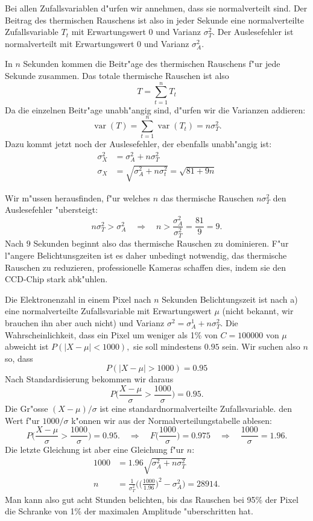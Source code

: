 \begin{loesung}
Bei allen Zufallsvariablen d"urfen wir annehmen, dass sie normalverteilt
sind. Der Beitrag des thermischen Rauschens ist also in jeder Sekunde
eine normalverteilte Zufallsvariable $T_t$ mit Erwartungswert 0
und Varianz $\sigma_T^2$.
Der Auslesefehler ist normalverteilt mit Erwartungswert 0 und
Varianz $\sigma_A^2$.
\begin{teilaufgaben}
\item In $n$ Sekunden kommen die Beitr"age des thermischen Rauschens
f"ur jede Sekunde zusammen. Das totale thermische Rauschen ist
also
\[
T=\sum_{t=1}^n T_t
\]
Da die einzelnen Beitr"age unabh"angig sind, d"urfen wir die Varianzen
addieren:
\[
\operatorname{var}(T)
=\sum_{t=1}^n\operatorname{var}(T_t)=n\sigma_T^2.
\]
Dazu kommt jetzt noch der Auslesefehler, der ebenfalls unabh"angig ist:
\begin{align*}
\sigma_X^2&=\sigma_A^2+n\sigma_T^2\\
\sigma_X&=\sqrt{\sigma_A^2+n\sigma_t^2}=\sqrt{81+9n}
\end{align*}
\item Wir m"ussen herausfinden, f"ur welches $n$ das thermische
Rauschen $n\sigma_T^2$ den Auslesefehler "ubersteigt:
\[
n\sigma_T^2>\sigma_A^2\quad\Rightarrow\quad n>\frac{\sigma_A^2}{\sigma_T^2}=\frac{81}{9}=9.
\]
Nach $9$ Sekunden beginnt also das thermische Rauschen zu dominieren.
F"ur l"angere Belichtunsgzeiten ist es daher unbedingt notwendig,
das thermische Rauschen zu reduzieren, professionelle Kameras
schaffen dies, indem sie den CCD-Chip stark abk"uhlen.
\item
Die Elektronenzahl in einem Pixel nach $n$ Sekunden Belichtungszeit ist
nach a) eine normalverteilte Zufallsvariable mit Erwartungswert
$\mu$ (nicht bekannt, wir brauchen ihn aber auch nicht) und Varianz
$\sigma^2=\sigma_A^1+n\sigma_T^2$. Die Wahrscheinlichkeit, dass ein Pixel
um weniger als 1\% von $C=100000$ von $\mu$ abweicht ist
$
P(|X-\mu| < 1000),
$
sie soll mindestens $0.95$ sein. Wir suchen also $n$ so, dass
\[
P(|X-\mu| > 1000) = 0.95
\]
Nach Standardisierung bekommen wir daraus
\[
P\biggl(\frac{X-\mu}{\sigma}> \frac{1000}{\sigma}\biggr)=0.95.
\]
Die Gr"osse $(X-\mu)/\sigma$ ist eine standardnormalverteilte
Zufallsvariable. den Wert f"ur $1000/\sigma$ k"onnen wir aus
der Normalverteilungstabelle ablesen:
\[
P\biggl(\frac{X-\mu}{\sigma}> \frac{1000}{\sigma}\biggr)=0.95.
\quad
\Rightarrow
\quad
F\biggl(\frac{1000}{\sigma}\biggr)=0.975
\quad
\Rightarrow
\quad
\frac{1000}{\sigma}=1.96.
\]
Die letzte Gleichung ist aber eine Gleichung f"ur $n$:
\begin{align*}
1000&=1.96\sqrt{\sigma_A^2 + n\sigma_T^2}\\
n&=\frac1{\sigma_T^2}\biggl(\biggl(\frac{1000}{1.96}\biggr)^2-\sigma_A^2\biggr)
=28914.
\end{align*}
Man kann also gut acht Stunden belichten, bis das Rauschen bei 95\% der
Pixel die Schranke von 1\% der maximalen Amplitude "uberschritten hat.
\qedhere
\end{teilaufgaben}
\end{loesung}

